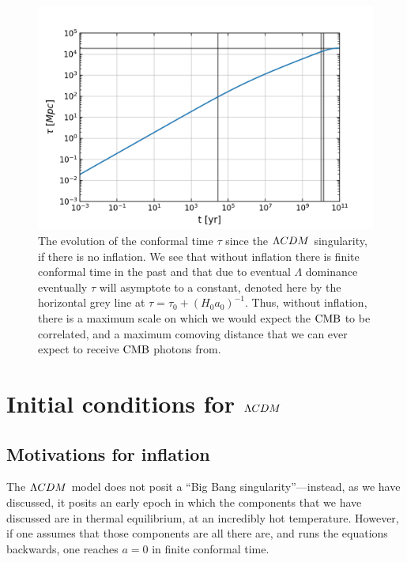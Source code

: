 \begin{figure}[!pth]
\centering     %
    \includegraphics[width=.75\columnwidth]{plots/lcdm_tau.png}
\caption{
    The evolution of the conformal time $\tau$ since the $\Lambda CDM$ singularity,
    if there is no inflation.
    We see that without inflation there is finite conformal time in the past
    and that due to eventual $\Lambda$ dominance
    eventually $\tau$ will asymptote to a constant,
    denoted here by the horizontal grey line at $\tau=\tau_0+(H_0a_0)^{-1}$.
    Thus, without inflation, there is a maximum scale on which we would expect the
    $\text{CMB}$ to be correlated, and a maximum comoving distance that we can ever
    expect to receive $\text{CMB}$ photons from.
}\label{fig:lcdm_tau}
\end{figure}


\section{Initial conditions for $\Lambda CDM$}
    \subsection{Motivations for inflation}
    The $\Lambda CDM$ model does not posit a ``Big Bang singularity''---instead, as we have discussed, it
    posits an early epoch in which the components that we have discussed are in thermal equilibrium,
    at an incredibly hot temperature.
    However, if one assumes that those components are all there are, and runs the equations backwards,
    one reaches $a=0$ in finite conformal time.


